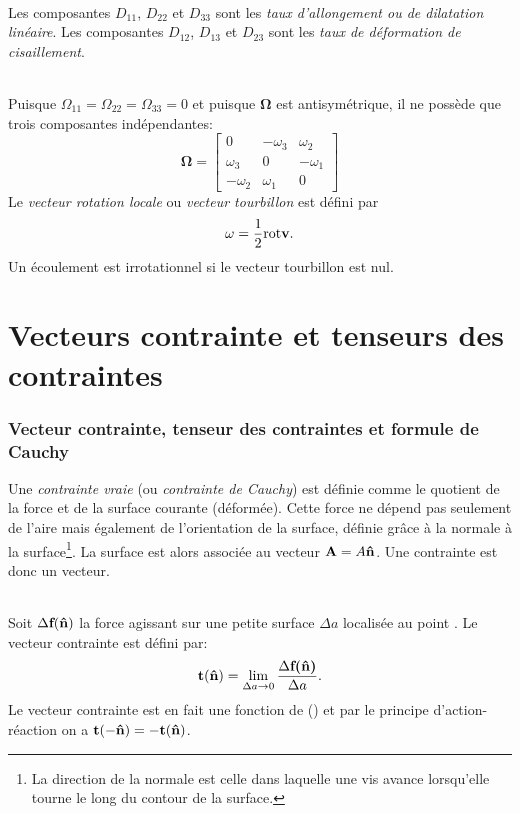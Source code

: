 \paragraph{}
Les composantes $D_{11}$, $D_{22}$ et $D_{33}$ sont les \emph{taux d'allongement ou de dilatation linéaire}. Les composantes $D_{12}$, $D_{13}$ et $D_{23}$ sont les \emph{taux de déformation de cisaillement}.
\paragraph{}
Puisque $\Omega_{11}=\Omega_{22}=\Omega_{33}=0$ et puisque $\mathbf{\Omega}$ est antisymétrique, il ne possède que trois composantes indépendantes:
$$\mathbf{\Omega}=\left[
\begin{array}{ccc}
0&-\omega_3&\omega_2\\
\omega_3&0&-\omega_1\\
-\omega_2&\omega_1&0
\end{array}\right]$$
Le \emph{vecteur rotation locale} ou \emph{vecteur tourbillon} est défini par
$$\mathbf{\omega}=\frac{1}{2}\text{rot}\textbf{v}.$$
Un écoulement est irrotationnel si le vecteur tourbillon est nul.

\part{Vecteurs contrainte et tenseurs des contraintes}
\section{Vecteur contrainte, tenseur des contraintes et formule de Cauchy}

Une \emph{contrainte vraie} (ou \emph{contrainte de Cauchy}) est définie comme le quotient de la force et de la surface courante (déformée). Cette force ne dépend pas seulement de l'aire mais également de l'orientation de la surface, définie grâce à la normale à la surface\footnote{La direction de la normale est celle dans laquelle une vis avance lorsqu'elle tourne le long du contour de la surface.}. La surface est alors associée au vecteur $\textbf{A}=A\textbf{\^n}$. Une contrainte est donc un vecteur.
\paragraph{}
Soit $\Delta\textbf{f}(\textbf{\^n})$ la force agissant sur une petite surface $\Delta a$ localisée au point . Le vecteur contrainte est défini par: $$\textbf{t}(\textbf{\^n})=\lim_{\Delta a\rightarrow 0}\frac{\Delta\textbf{f(\textbf{\^n})}}{\Delta a}.$$ Le vecteur contrainte est en fait une fonction de () et par le principe d'action-réaction on a $\textbf{t}(-\textbf{\^n})=-\textbf{t}(\textbf{\^n})$.
